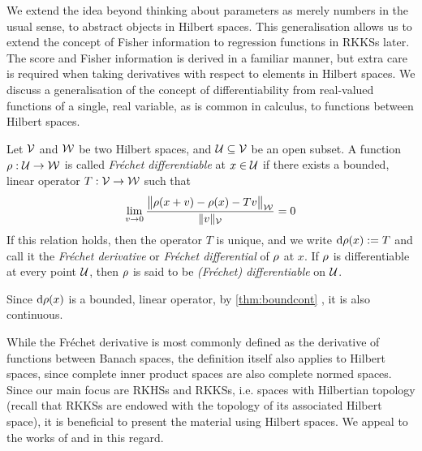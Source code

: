 We extend the idea beyond thinking about parameters as merely numbers in the usual sense, to abstract objects in Hilbert spaces. 
This generalisation allows us to extend the concept of Fisher information to regression functions in RKKSs later.
The score and Fisher information is derived in a familiar manner, but extra care is required when taking derivatives with respect to elements in Hilbert spaces.  
We discuss a generalisation of the concept of differentiability from real-valued functions of a single, real variable, as is common in calculus, to functions between Hilbert spaces.

\begin{definition}\label{def:frechet}
  Let ${\mathcal V}$ and ${\mathcal W}$ be two Hilbert spaces, and ${\mathcal U} \subseteq {\mathcal V}$ be an open subset.
  A function $\rho :{\mathcal U}\to{\mathcal W}$ is called \emph{Fréchet differentiable} at $x \in {\mathcal U}$ if there exists a bounded, linear operator $T:{\mathcal V}\to{\mathcal W}$ such that 
  \[
    \lim_{v\to 0} \frac{\big\Vert \rho(x+v) - \rho(x) - T v \big\Vert_{{\mathcal W}}}{\lVert v\rVert_{\mathcal V}} = 0
  \]
  If this relation holds, then the operator $T$ is unique, and we write $\text{d} \rho(x) := T$ and call it the \emph{Fréchet derivative} or \emph{Fréchet differential} of $\rho$ at $x$.
  If $\rho$ is differentiable at every point ${\mathcal U}$, then $\rho$ is said to be \emph{(Fréchet) differentiable} on ${\mathcal U}$.
\end{definition}

\begin{remark}
  Since $\text{d} \rho(x)$ is a bounded, linear operator, by \cref{thm:boundcont} , it is also continuous. 
\end{remark}

\begin{remark}
  While the Fréchet derivative is most commonly defined as the derivative of functions between Banach spaces,  the definition itself also applies to Hilbert spaces, since complete inner product spaces are also complete normed spaces.
  Since our main focus are RKHSs and RKKSs, i.e. spaces with Hilbertian topology (recall that RKKSs are endowed with the topology of its associated Hilbert space), it is beneficial to present the material using Hilbert spaces.
  We appeal to the works of \citet[def. 3.6.5]{balakrishnan1981applied} and \citet[sec. 6]{bouboulis2011extension} in this regard.
\end{remark}

